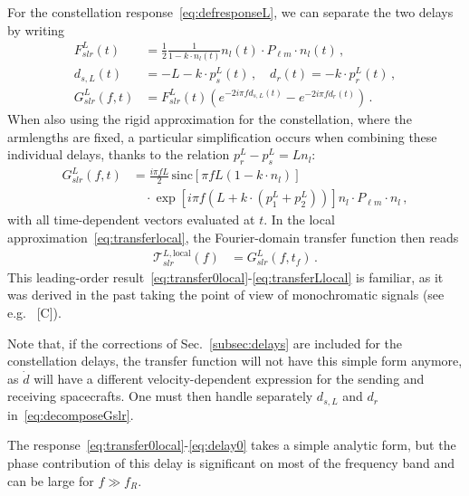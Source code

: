 \documentclass[aps,showpacs,twocolumn,
prd,superscriptaddress,nofootinbib]{revtex4-1}
\newcommand\calT{{\mathcal{T}}}
\newcommand{\nn}{\nonumber}
\newcommand{\hatk}{k}
\newcommand{\sinc}{\,\mathrm{sinc}}
\newcommand{\tf}{t_{f}}
\newcommand{\SM}[1]{{\color{Red} #1}}
\begin{document}
For the constellation response~\eqref{eq:defresponseL}, we can separate the two delays by writing
\begin{align}\label{eq:decomposeGslr}
	F_{slr}^{L}(t) &= \frac{1}{2} \frac{1}{1 - \hatk\cdot n_{l}(t)} n_{l}(t) \cdot P_{\ell m} \cdot n_{l} (t) \,,\nn\\
	d_{s,L}(t) &= -L - k\cdot p_{s}^{L}(t) \,, \quad d_{r}(t) = - k\cdot p_{r}^{L}(t) \,,\nn\\
	G_{slr}^{L}(f,t) &=  F_{slr}^{L}(t) \left( e^{-2i\pi f d_{s,L}(t)} - e^{-2i\pi f d_{r}(t)} \right) \,.
\end{align}
When also using the rigid approximation for the constellation, where the armlengths are fixed, a particular simplification occurs when combining these individual delays, thanks to the relation $p^{L}_{r} - p^{L}_{s} =  L n_{l}$:
\begin{align}\label{eq:GslrL}
	G_{slr}^{L}(f,t) &= \frac{i \pi f L}{2} \sinc \left[ \pi f L\left(1-\hatk\cdot n_{l} \right) \right] \nn\\
	& \quad \cdot \exp\left[ i \pi f \left( L + \hatk\cdot \left( p_{1}^{L} + p_{2}^{L} \right) \right) \right]  n_{l} \cdot P_{\ell m} \cdot n_{l} \,,
\end{align}
with all time-dependent vectors evaluated at $t$. In the local approximation~\eqref{eq:transferlocal}, the Fourier-domain transfer function then reads
\begin{align}\label{eq:transferLlocal}
	\calT_{slr}^{L, \mathrm{local}}(f) &= G_{slr}^{L}(f, \tf) \,.
\end{align}
This leading-order result~\eqref{eq:transfer0local}-\eqref{eq:transferLlocal} is familiar, as it was derived in the past taking the point of view of monochromatic signals (see e.g.~\cite{} \SM{[C]}).

Note that, if the corrections of Sec.~\ref{subsec:delays} are included for the constellation delays, the transfer function will not have this simple form anymore, as $\dot{d}$ will have a different velocity-dependent expression for the sending and receiving spacecrafts. One must then handle separately $d_{s,L}$ and $d_{r}$ in~\eqref{eq:decomposeGslr}.

The response~\eqref{eq:transfer0local}-\eqref{eq:delay0} takes a simple analytic form, but the phase contribution of this delay is significant on most of the frequency band and can be large for $f \gg f_{R}$.
\end{document}
